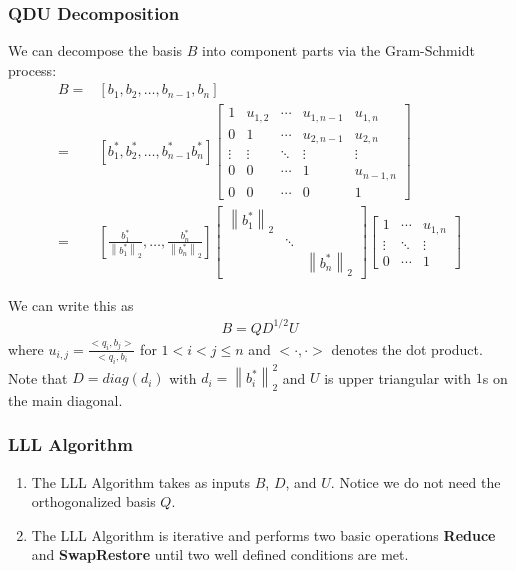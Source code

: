 \documentclass{beamer}
\newcommand{\norm}[1]{\left\lVert#1\right\rVert}
\begin{document}
\begin{frame}
\frametitle{QDU Decomposition}
We can decompose the basis $B$ into component parts via the Gram-Schmidt process:
\begin{align*}
B=&\left[b_1,b_2,\ldots,b_{n-1},b_n\right]\\
 =&\left[b^*_1,b^*_2,\ldots,b^*_{n-1}b^*_n\right]
	\left[ \begin{array}{ccccc}
		1 & u_{1,2} & \cdots & u_{1,n-1} & u_{1,n} \\
		0 & 1       & \cdots & u_{2,n-1} & u_{2,n} \\
		\vdots & \vdots & \ddots & \vdots & \vdots \\
		0 & 0       & \cdots & 1 & u_{n-1,n}       \\
		0 & 0       & \cdots & 0 & 1               
	\end{array}\right]\\
 =&\left[\frac{b^*_1}{\norm{b^*_1}_2},\ldots,\frac{b^*_n}{\norm{b^*_n}_2}\right]
   \left[\begin{array}{ccc}
		\norm{b^*_1}_2  &  \\
		&  \ddots       &  \\
		&      &\norm{b^*_n}_2 
   \end{array}\right]
   \left[\begin{array}{ccc}
		1 & \cdots & u_{1,n} \\
		\vdots & \ddots & \vdots \\
		0 & \cdots & 1
   \end{array}\right]
\end{align*}
\end{frame}
\begin{frame}
We can write this as
\begin{eqnarray}
B=QD^{1/2}U\label{decomp}
\end{eqnarray}
where $u_{i,j}=\frac{<q_i,b_j>}{<q_i,b_i}$ for $1 < i < j \leq n$ and $<\cdot,\cdot>$ denotes the dot product. Note that $D=diag(d_i)$ with $d_i=\norm{b^*_i}^2_2$ and $U$ is upper triangular with $1$s on the main diagonal.
\end{frame}

\begin{frame}
\frametitle{LLL Algorithm}
\begin{enumerate}
\item The LLL Algorithm takes as inputs $B$, $D$, and $U$. Notice we do not need the orthogonalized basis $Q$.
\item The LLL Algorithm is iterative and performs two basic operations \textbf{Reduce} and \textbf{SwapRestore} until two well defined conditions are met.\cite{LuoQiaoParallelLLL}
\end{enumerate}
\end{frame}
\end{document}
